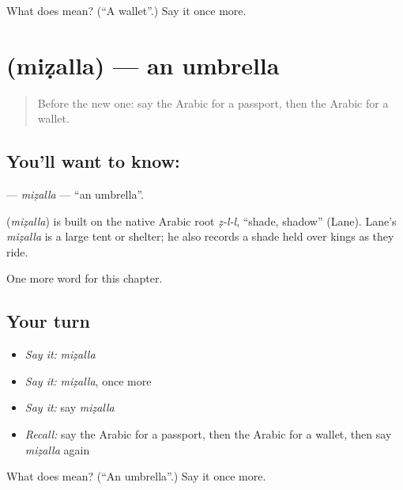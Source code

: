 \begin{tcolorbox}[breakable,colback=teal!4,colframe=teal!35!black,title={Before you move on}]
What does  mean? (\textquotedblleft{}A wallet\textquotedblright{}.) Say it once more.
\end{tcolorbox}
\section[\texorpdfstring{\ar{مظلة} (miẓalla)}{مظلة (miẓalla)}]{ (miẓalla) — an umbrella}

\label{lesson:AR-C118-mizalla}



\begin{quote}
Before the new one: say the Arabic for a passport, then the Arabic for a wallet.
\end{quote}

\subsection*{You'll want to know: }
\textbf{} — \emph{miẓalla} — \textquotedblleft{}an umbrella\textquotedblright{}.

\begin{cousinweb}
\textbf{} (\emph{miẓalla}) is built on the native Arabic root \emph{ẓ-l-l}, \textquotedblleft{}shade, shadow\textquotedblright{} (Lane). Lane's \emph{miẓalla} is a large tent or shelter; he also records a shade held over kings as they ride.
\end{cousinweb}

\begin{grammarlens}[title={What you've built}]
One more word for this chapter.
\end{grammarlens}

\subsection*{Your turn}
\begin{itemize}
\raggedright
  \item \emph{Say it:} \emph{miẓalla}
  \item \emph{Say it:} \emph{miẓalla}, once more
  \item \emph{Say it:} say \emph{miẓalla}
  \item \emph{Recall:} say the Arabic for a passport, then the Arabic for a wallet, then say \emph{miẓalla} again
\end{itemize}

\begin{tcolorbox}[breakable,colback=teal!4,colframe=teal!35!black,title={Before you move on}]
What does  mean? (\textquotedblleft{}An umbrella\textquotedblright{}.) Say it once more.
\end{tcolorbox}
